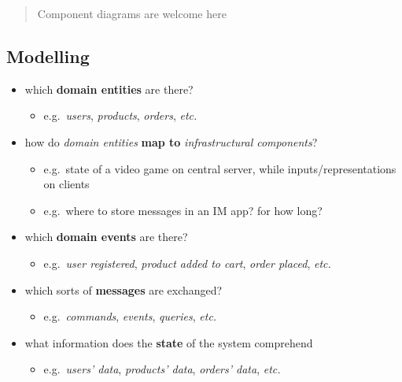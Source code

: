 \documentclass{scrartcl}
\begin{document}
\begin{quote}
Component diagrams are welcome here
\end{quote}

\subsection{Modelling}\label{modelling}

\begin{itemize}
  \item which \textbf{domain entities} are there?

  \begin{itemize}
    \item e.g.~\emph{users}, \emph{products}, \emph{orders}, \emph{etc.}
  \end{itemize}
  \item how do \emph{domain entities} \textbf{map to} \emph{infrastructural
  components}?

  \begin{itemize}
    \item e.g.~state of a video game on central server, while
    inputs/representations on clients
    \item e.g.~where to store messages in an IM app? for how long?
  \end{itemize}
  \item which \textbf{domain events} are there?

  \begin{itemize}
    \item e.g.~\emph{user registered}, \emph{product added to cart},
    \emph{order placed}, \emph{etc.}
  \end{itemize}
  \item which sorts of \textbf{messages} are exchanged?

  \begin{itemize}
    \item e.g.~\emph{commands}, \emph{events}, \emph{queries}, \emph{etc.}
  \end{itemize}
  \item what information does the \textbf{state} of the system comprehend

  \begin{itemize}
    \item e.g.~\emph{users' data}, \emph{products' data}, \emph{orders' data},
    \emph{etc.}
  \end{itemize}
\end{itemize}
\end{document}
